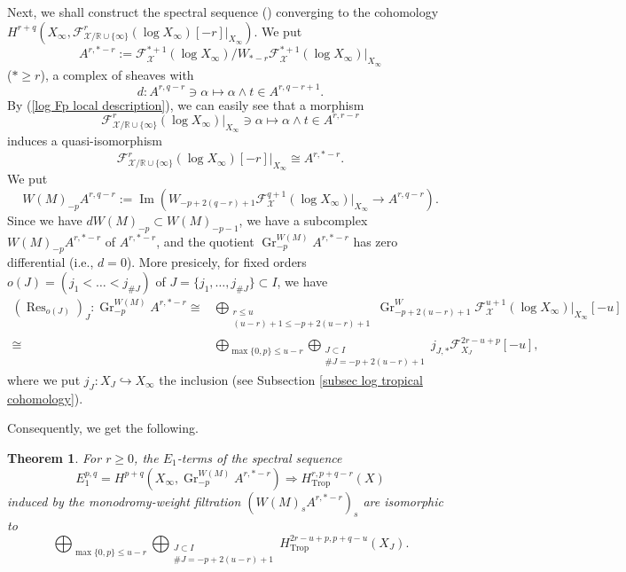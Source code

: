 \documentclass[12pt,a4]{amsart}
\newtheorem{thm}{Theorem}[section]
\def\R{\mathbb{R}}
\def\F{\mathscr{F}}
\def\X{\mathscr{X}}
\def\Res{\mathop{\mathrm{Res}}\nolimits}
\def\Gr{\mathop{\mathrm{Gr}}\nolimits}
\def\Im{\mathop{\mathrm{Im}}\nolimits}
\def\Trop{\mathop{\mathrm{trop}}\nolimits}
\def\Trop{\mathop{\mathrm{Trop}}\nolimits}
\def\Gr{\mathop{\mathrm{Gr}}\nolimits}
\numberwithin{equation}{section}
\numberwithin{figure}{section}
\begin{document}
  
  Next, 
  we shall construct 
   the spectral sequence 
  () 
   converging to the cohomology 
  $H^{r+q} ( X_{\infty} ,  
   \F^r_{\X / \R \cup \{ \infty  \} } (\log X_{\infty} )[-r] |_{ X_{\infty}  })$.
  We put 
  $$A^{r,*-r} := \F^{*+1}_{\X} (\log X_{\infty} )/ W_{*-r} \F^{*+1}_{\X} (\log X_{\infty} ) |_{X_{\infty}}$$
  ($* \geq r$),
  a complex of sheaves with 
  $$d \colon A^{r,q-r } \ni \alpha \mapsto  \alpha  \wedge t \in A^{r,q-r +1}.$$
  By (\ref{log Fp local description}), 
  we can easily see that 
  a morphism 
  $$\F^r_{\X / \R \cup \{ \infty  \} } (\log X_{\infty} )  |_{ X_{\infty}  }
  \ni \alpha 
  \mapsto   \alpha \wedge t
   \in A^{r,r-r}$$
  induces a quasi-isomorphism 
  $$\F^r_{\X / \R \cup \{ \infty  \} } (\log X_{\infty} ) [-r] |_{ X_{\infty}  } \cong A^{r,*-r}.$$
  We put 
  $$ W(M)_{-p} A^{r,q-r} 
  := \Im (W_{-p+2(q-r) +1}\F^{q+1}_{\X } (\log X_{\infty} ) |_{ X_{\infty}  }  \to A^{r,q-r}). $$
  Since we have $d W(M)_{-p} \subset W(M)_{-p-1}$, 
  we have a subcomplex $W(M)_{-p} A^{r,*-r} $
  of $ A^{r,*-r} $, 
   and the quotient $\Gr^{W(M)}_{-p} A^{r,*-r} $ has zero differential (i.e., $d=0$).
   More presicely, 
   for fixed orders 
   $ o(J)= ( j_1 < \dots < j_{ \# J } )$
   of $J = \{ j_1, \dots, j_{ \# J } \} \subset I$,
  we have 
  \begin{align*}
   (\Res_{ o(J) })_J 
   \colon 
   \Gr^{W(M)}_{-p} A^{r,*-r} 
   \cong &  
    \bigoplus_{\substack{ r \leq u 
               \\   (u-r) +1 \leq -p + 2(u-r) +1 } }
    \Gr^W_{-p +2(u -r) +1} \F_{\X}^{u+1} (\log X_{\infty}) |_{X_{\infty}} 
    [-u] \\
   \cong &  
    \bigoplus_{ \max \{0, p \} \leq u-r  }
    \bigoplus_{\substack{ J \subset I \\ \# J = -p + 2(u-r) +1 } }
     j_{J,*} \F_{X_{J}}^{2r-u+p}  [-u], 
  \end{align*}
  where we put $j_J \colon X_J \hookrightarrow X_{\infty}$ the inclusion (see Subsection \ref{subsec log tropical cohomology}).
  
  Consequently, we get the following.
  \begin{thm}\label{spectral sequence for ss reduction}
    For $r \geq 0$, 
    the $E_1$-terms of the spectral sequence 
    $$E_1^{p,q}= H^{p+q} (X_{\infty}, \Gr^{W(M)}_{-p} A^{r,*-r}  )  \Rightarrow H^{r,p+q-r}_{\Trop } (X)$$
      induced by the monodromy-weight filtration $(W(M)_s A^{r,*-r})_{s } $ are isomorphic to
    $$\bigoplus_{ \max \{0,p\} \leq u -r }
    \bigoplus_{\substack{ J \subset I \\ \# J = -p + 2 (u-r) +1 } }
  H^{2r-u+p, p+q -u}_{\Trop} (X_{J}). $$
  \end{thm}
 
\end{document}
